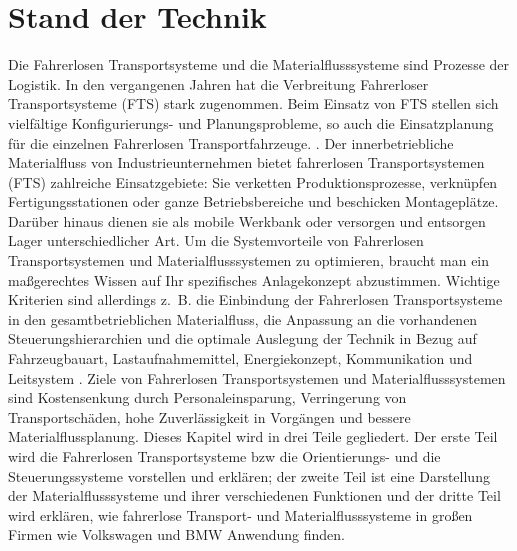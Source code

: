 \section{Stand der Technik}
Die Fahrerlosen Transportsysteme und die Materialflusssysteme sind Prozesse der Logistik. In den vergangenen Jahren 
hat die Verbreitung Fahrerloser Transportsysteme (FTS) stark zugenommen. Beim Einsatz von FTS stellen sich vielfältige 
Konfigurierungs- und Planungsprobleme, so auch die Einsatzplanung f\"ur die einzelnen Fahrerlosen Transportfahrzeuge. 
\cite[vgl.][S. 2]{Guenther;Krueger:2000}. Der innerbetriebliche Materialfluss von Industrieunternehmen bietet 
fahrerlosen Transportsystemen (FTS) zahlreiche Einsatzgebiete: Sie verketten Produktionsprozesse, verknüpfen 
Fertigungsstationen oder ganze Betriebsbereiche und beschicken Montageplätze. Darüber hinaus dienen sie als 
mobile Werkbank oder versorgen und entsorgen Lager unterschiedlicher Art. Um die Systemvorteile von Fahrerlosen 
Transportsystemen und Materialflusssystemen zu optimieren, braucht man ein ma\ss gerechtes Wissen auf Ihr spezifisches 
Anlagekonzept abzustimmen. Wichtige Kriterien sind allerdings z.~B. die Einbindung der Fahrerlosen Transportsysteme in 
den gesamtbetrieblichen Materialfluss, die Anpassung an die vorhandenen Steuerungshierarchien und die optimale Auslegung 
der Technik in Bezug auf Fahrzeugbauart, Lastaufnahmemittel, Energiekonzept, Kommunikation und Leitsystem \cite[vgl.][S. 2]{Werner:2014:Online}.
Ziele von Fahrerlosen Transportsystemen und Materialflusssystemen sind Kostensenkung durch Personaleinsparung, 
Verringerung von Transportsch\"aden, hohe Zuverl\"assigkeit in Vorg\"angen und bessere Materialflussplanung.
Dieses Kapitel wird in drei Teile gegliedert. Der erste Teil wird die Fahrerlosen Transportsysteme bzw die 
Orientierungs- und die Steuerungssysteme vorstellen und erkl\"aren; der zweite Teil ist eine Darstellung der 
Materialflusssysteme und ihrer verschiedenen Funktionen und der dritte Teil wird erkl\"aren, wie fahrerlose 
Transport- und Materialflusssysteme in gro\ss en Firmen wie Volkswagen und BMW Anwendung finden.

